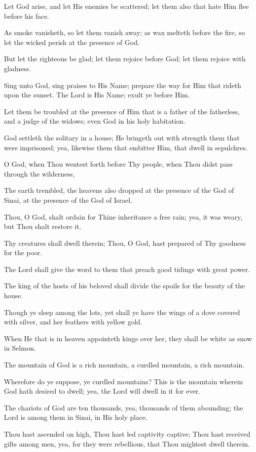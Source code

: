Let God arise, and let His enemies be scattered; let them also that hate Him flee before his face.

As smoke vanisheth, so let them vanish away; as wax melteth before the fire, so let the wicked perish at the presence of God.

But let the righteous be glad; let them rejoice before God; let them rejoice with gladness.

Sing unto God, sing praises to His Name; prepare the way for Him that rideth upon the sunset. The Lord is His Name; exult ye before Him.

Let them be troubled at the presence of Him that is a father of the fatherless, and a judge of the widows; even God in his holy habitation.

God settleth the solitary in a house; He bringeth out with strength them that were imprisoned; yea, likewise them that embitter Him, that dwell in sepulchres.

O God, when Thou wentest forth before Thy people, when Thou didst pass through the wilderness,

The earth trembled, the heavens also dropped at the presence of the God of Sinai, at the presence of the God of Israel.

Thou, O God, shalt ordain for Thine inheritance a free rain; yea, it was weary, but Thou shalt restore it.

Thy creatures shall dwell therein; Thou, O God, hast prepared of Thy goodness for the poor.

The Lord shall give the word to them that preach good tidings with great power.

The king of the hosts of his beloved shall divide the spoils for the beauty of the house.

Though ye sleep among the lots, yet shall ye have the wings of a dove covered with silver, and her feathers with yellow gold.

When He that is in heaven appointeth kings over her, they shall be white as snow in Selmon.

The mountain of God is a rich mountain, a curdled mountain, a rich mountain.

Wherefore do ye suppose, ye curdled mountains? This is the mountain wherein God hath desired to dwell; yea, the Lord will dwell in it for ever.

The chariots of God are ten thousands, yea, thousands of them abounding; the Lord is among them in Sinai, in His holy place.

Thou hast ascended on high, Thou hast led captivity captive; Thou hast received gifts among men, yea, for they were rebellious, that Thou mightest dwell therein.

